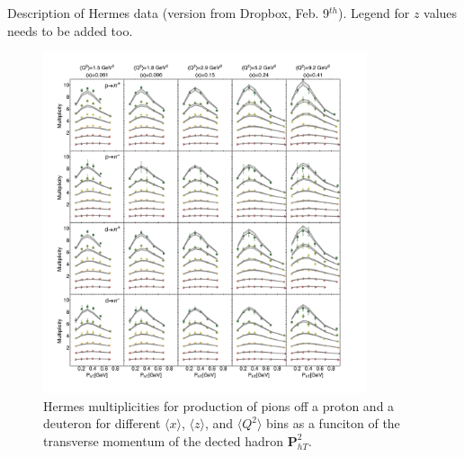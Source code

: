 \documentclass[aps,preprintnumbers,showpacs,nofootinbib,superscriptaddress,floatfix]{revtex4}
\begin{document}
Description of Hermes data (version from Dropbox, Feb. 9$^{th}$).
Legend for $z$ values needs to be added too.
\begin{figure}[h!]
\begin{center}
\includegraphics[width=0.85\textwidth]{plots/Hermes/Hermes_Pions_SCIplot_flINDEP.pdf}
\end{center}
\caption{Hermes multiplicities for production of pions off a proton and a deuteron for different $\langle x \rangle$, $\langle z \rangle$, and $\langle Q^2 \rangle$ bins as a funciton of the transverse momentum of the dected hadron ${\bm P}_{hT}^ 2$.} 
\label{f:H_pions}
\end{figure}
\end{document}
